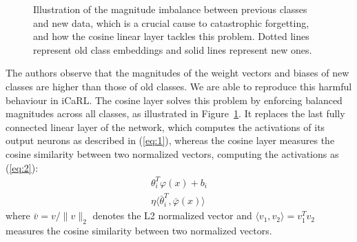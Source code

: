 \documentclass[10pt,twocolumn,letterpaper]{article}
\begin{document}
\begin{figure}
\begin{center}
\end{center}
\caption{Illustration of the magnitude imbalance between previous classes and new data, which is a crucial cause to catastrophic forgetting, and how the cosine linear layer tackles this problem. Dotted lines represent old class embeddings and solid lines represent new ones.}
\label{fig:classifier:cosine:features}
\end{figure}

The authors observe that the magnitudes of the weight vectors and biases of new classes are higher than those of old classes. We are able to reproduce this harmful behaviour in iCaRL. The cosine layer solves this problem by enforcing balanced magnitudes across all classes, as illustrated in Figure~\ref{fig:classifier:cosine:features}. It replaces the last fully connected linear layer of the network, which computes the activations of its output neurons as described in (\ref{eq:1}), whereas the cosine layer measures the cosine similarity between two normalized vectors, computing the activations as (\ref{eq:2}):
\begin{align}
    \theta_{i}^{T} \varphi(x) + b_{i} \label{eq:1}\\
    \eta \langle \bar{\theta}_{i}^{T}, \bar{\varphi}(x) \rangle \label{eq:2}
\end{align}
where $\bar{v} = v/\lVert v \rVert_{2}$ denotes the L2 normalized vector and $\langle v_{1}, v_{2} \rangle = v_{1}^{T} v_{2}$ measures the cosine similarity between two normalized vectors.
\end{document}
